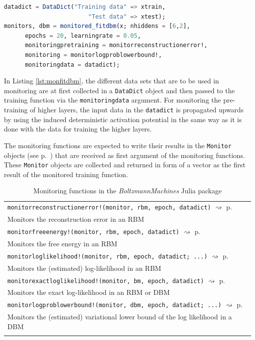 \documentclass[12pt]{article}
\newcommand{\inlinecode}[1]{\texttt{#1}}
\newcommand{\apkg}[1]{\emph{#1}}
\newcommand{\rightpageref}[1]{\hfill $\rightsquigarrow$ p.\ \pageref{#1}}
\begin{document}
\begin{lstlisting}[language=Julia,caption={Monitoring pre-training and fine-tuning}, label={lst:monfitdbm}]
datadict = DataDict("Training data" => xtrain,
                        "Test data" => xtest);
monitors, dbm = monitored_fitdbm(x; nhiddens = [6,2],
      epochs = 20, learningrate = 0.05,
      monitoringpretraining = monitorreconstructionerror!,
      monitoring = monitorlogproblowerbound!,
      monitoringdata = datadict);
\end{lstlisting}

In Listing \ref{lst:monfitdbm}, the different data sets that are to be used in monitoring are at first collected in a \inlinecode{DataDict} object and then passed to the training function via the  \inlinecode{monitoringdata} argument.
For monitoring the pre-training of higher layers, the input data in the \inlinecode{datadict} is propagated upwards by using the induced deterministic activation potential in the same way as it is done with the data for training the higher layers.

The monitoring functions are expected to write their results in the \inlinecode{Monitor} objects (see p.\ \pageref{bms_Monitor}) that are received as first argument of the monitoring functions.
These \inlinecode{Monitor} objects are collected and returned in form of a vector as the first result of the monitored training function.



\begin{table}[h]
\caption{Monitoring functions in the \apkg{BoltzmannMachines} Julia package}
\label{monfun}
   \begin{tabularx}{\textwidth}{X}
 \Xhline{1pt}
   \inlinecode{monitorreconstructionerror!(monitor, rbm, epoch, datadict)} \rightpageref{bms_monitorreconstructionerror!}\\
     Monitors the reconstruction error in an RBM \\
     \inlinecode{monitorfreeenergy!(monitor, rbm, epoch, datadict)} \rightpageref{bms_monitorfreeenergy!}\\
Monitors the free energy in an RBM \\
     \inlinecode{monitorloglikelihood!(monitor, rbm, epoch, datadict; ...)} \rightpageref{bms_monitorloglikelihood!}\\
Monitors the (estimated) log-likelihood in an RBM \\
        \inlinecode{monitorexactloglikelihood!(monitor, bm, epoch, datadict)} \rightpageref{bms_monitorexactloglikelihood!}\\
Monitors the exact log-likelihood in an RBM or DBM \\
     \inlinecode{monitorlogproblowerbound!(monitor, dbm, epoch, datadict; ...)} \rightpageref{bms_monitorlogproblowerbound!}\\
  Monitors the (estimated) variational lower bound of the log likelihood in a DBM \\
   \Xhline{1pt}
\end{tabularx}
\end{table}
\end{document}
